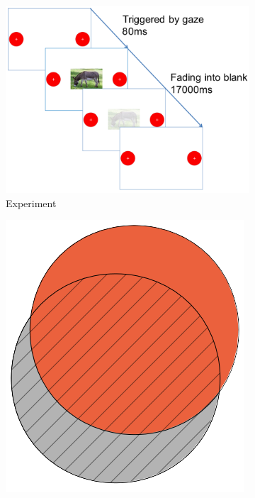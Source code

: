 \documentclass[a4paper]{scrreprt}
\begin{document}
\begin{figure}
\centering
\begin{subfigure}[b]{0.5\textwidth}
        \includegraphics[width=\textwidth]{figs/wang12_fig5_3.png}
        \caption{Experiment}
    \end{subfigure}
    \quad
    \begin{subfigure}[b]{0.3\textwidth}
        \includegraphics[width=\textwidth]{figs/calibration_figure.png}

\end{subfigure}
\end{figure}
\end{document}
